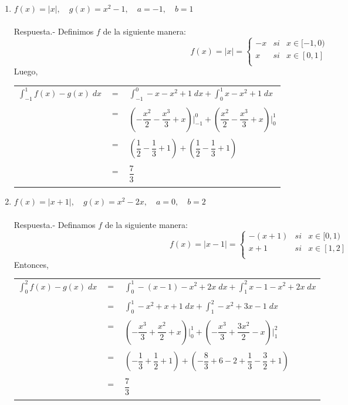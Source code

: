 \begin{enumerate}[\bfseries 1.]
    \item $f(x)=|x|,\quad g(x) = x^2-1, \quad a=-1,\quad b=1$\\\\
	Respuesta.-\; Definimos $f$ de la siguiente manera: $$f(x) = |x| = \left\{\begin{array}{rcl}
	    -x&si&x\in [-1,0)\\
	    x&si&x\in [0,1]\\
	    \end{array}\right.$$
	    Luego,
	    \begin{center}
	    \begin{tabular}{rcl}
		$\displaystyle\int_{-1}^1 f(x)-g(x) \; dx$ & $=$ & $\displaystyle\int_{-1}^0 -x-x^2+1 \; dx + \int_0^1 x-x^2+1 \; dx$\\\\
		& $=$ & $ \left(-\dfrac{x^2}{2}-\dfrac{x^3}{3} + x \right) \bigg|_{-1}^0 + \left(\dfrac{x^2}{2} - \dfrac{x^3}{3} + x\right)\bigg|_0^1 $\\\\
		& $=$ & $\left(\dfrac{1}{2} - \dfrac{1}{3}+1\right)+\left(\dfrac{1}{2}-\dfrac{1}{3} + 1\right)$\\\\
		& $=$ & $\dfrac{7}{3}$ \\\\
	    \end{tabular}
	    \end{center}

\item $f(x) = |x+1|,\quad g(x)=x^2-2x, \quad a=0, \quad b=2$\\\\
    Respuesta.- \; Definamos $f$ de la siguiente manera:
	$$f(x)= |x-1| = \left\{
	    \begin{array}{rcl}
		-(x+1)&si&x\in[0,1)\\
		x+1&si&x\in [1,2]\\
	    \end{array}
	    \right.$$
	    Entonces, 
	    \begin{center} 
		\begin{tabular}{rcl}
		    $\displaystyle\int_0^2 f(x)-g(x) \; dx$&$=$&$\displaystyle\int_0^1 -(x-1)-x^2+2x\; dx + \int_1^2 x-1-x^2+2x \; dx$\\\\
		    & $=$ &$\displaystyle\int_0^1 -x^2+x+1\; dx + \int_1^2 -x^2+3x - 1 \; dx$\\\\
		    & $=$ & $\left(-\dfrac{x^3}{3} + \dfrac{x^2}{2} + x\right)\bigg|_0^1 + \left(-\dfrac{x^3}{3} + \dfrac{3x^2}{2} -x\right)\bigg|_1^2$\\\\
		    & $=$ & $\left(-\dfrac{1}{3} + \dfrac{1}{2} + 1\right)+\left(-\dfrac{8}{3} + 6-2+\dfrac{1}{3} -\dfrac{3}{2} + 1\right)$\\\\
		    & $=$ & $\dfrac{7}{3}$\\\\
		\end{tabular}
	    \end{center}


\end{enumerate}
